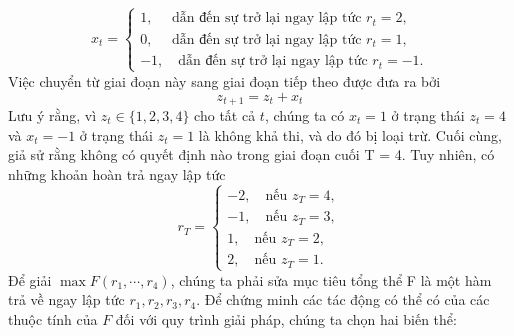 \documentclass[12pt,a4paper]{report}
\begin{document}
	$$
	x_t = \begin{cases}
	1, \quad \text{ dẫn đến sự trở lại ngay lập tức } r_t = 2,\\ 
	0, \quad\text{ dẫn đến sự trở lại ngay lập tức } r_t = 1,\\
	-1, \quad\text{dẫn đến sự trở lại ngay lập tức } r_t = -1.
	\end{cases}
	$$
	Việc chuyển từ giai đoạn này sang giai đoạn tiếp theo được đưa ra bởi $$ z_{t+1} = z_t + x_t $$
	Lưu ý rằng, vì $z_t \in \{1,2,3,4\}$ cho tất cả $t$, chúng ta có $x_t = 1$ ở trạng thái $z_t = 4$ và $x_t = -1$ ở trạng thái $z_t = 1$ là không khả thi, và do đó bị loại trừ. Cuối cùng, giả sử rằng không có quyết định nào trong giai đoạn cuối T = 4. Tuy nhiên, có những khoản hoàn trả ngay lập tức	$$
	r_T = \begin{cases}
	-2, \quad \text{nếu } z_T = 4,\\
	-1, \quad \text{nếu } z_T = 3,\\
	1, \quad \text{nếu } z_T = 2,\\
	2, \quad \text{nếu } z_T = 1.
	\end{cases}$$
	\nonumber	  
	Để giải $\max F(r_1, \cdots, r_4)$, chúng ta phải sửa mục tiêu tổng thể F là một hàm trả về ngay lập tức $r_1, r_2, r_3, r_4$. Để chứng minh các tác động có thể có của các thuộc tính của $F$ đối với quy trình giải pháp, chúng ta chọn hai biến thể:
	
\end{document}
